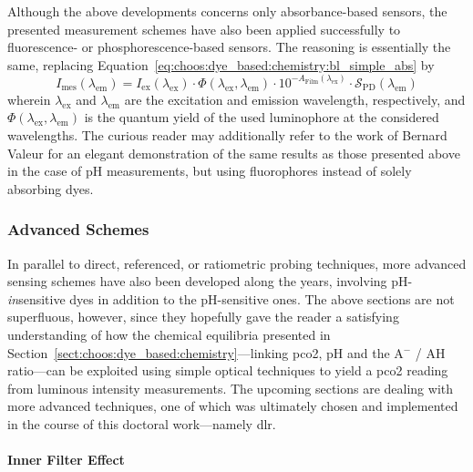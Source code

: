 Although the above developments concerns only absorbance-based sensors, the presented measurement schemes have also been applied successfully to fluorescence- or phosphorescence-based sensors\cite{uttamlal1995, ge2003, ge2014, wang2020}. The reasoning is essentially the same, replacing Equation~\ref{eq:choos:dye_based:chemistry:bl_simple_abs} by
\begin{equation}
	I_\text{mes}(\lambda_\text{em}) = I_\text{ex}(\lambda_\text{ex}) \cdot \Phi(\lambda_\text{ex}, \lambda_\text{em}) \cdot 10^{-A_\text{Film}(\lambda_\text{ex})} \cdot \mathcal{S}_\text{PD}(\lambda_\text{em})
\end{equation}
wherein $\lambda_\text{ex}$ and $\lambda_\text{em}$ are the excitation and emission wavelength, respectively, and $\Phi(\lambda_\text{ex}, \lambda_\text{em})$ is the quantum yield of the used luminophore at the considered wavelengths. The curious reader may additionally refer to the work of Bernard Valeur\cite[p.~338]{valeur2001_chap10} for an elegant demonstration of the same results as those presented above in the case of pH measurements, but using fluorophores instead of solely absorbing dyes.

\subsubsection{Advanced Schemes}\label{sect:choos:dye_based:optical_schemes:advanced}

In parallel to direct, referenced, or ratiometric probing techniques, more advanced sensing schemes have also been developed along the years, involving pH-\emph{in}sensitive dyes in addition to the pH-sensitive ones. The above sections are not superfluous, however, since they hopefully gave the reader a satisfying understanding of how the chemical equilibria presented in Section~\ref{sect:choos:dye_based:chemistry}---linking \gls{pco2}, pH and the A$^-$ / AH ratio---can be exploited using simple optical techniques to yield a \gls{pco2} reading from luminous intensity measurements. The upcoming sections are dealing with more advanced techniques, one of which was ultimately chosen and implemented in the course of this doctoral work---namely \gls{dlr}.

\paragraph{Inner Filter Effect}\label{subsect:choos:dye_based:optical_schemes:ife}\mbox{}\\

